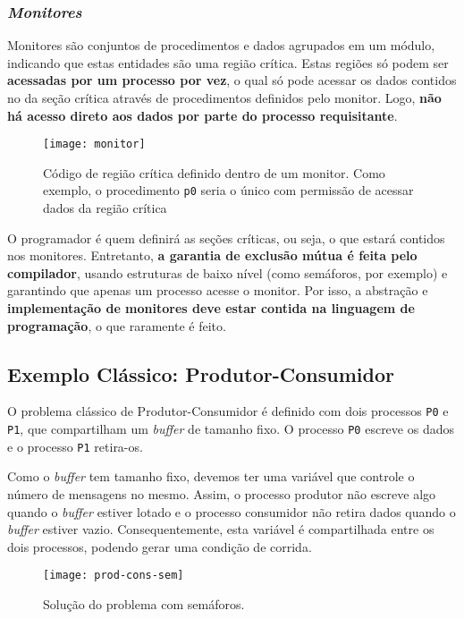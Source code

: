 \subsubsection{\textit{Monitores}}
Monitores são conjuntos de procedimentos e dados agrupados em um módulo, indicando que estas entidades são uma região crítica. Estas regiões só podem ser \textbf{acessadas por um processo por vez}, o qual só pode acessar os dados contidos no da seção crítica através de procedimentos definidos pelo monitor. Logo, \textbf{não há acesso direto aos dados por parte do processo requisitante}.

\begin{figure}[ht]
  \centering
  \texttt{[image: monitor]}
  \caption{Código de região crítica definido dentro de um monitor. Como exemplo, o procedimento \texttt{p0} seria o único com permissão de acessar dados da região crítica}
  \label{fig:monitor}
\end{figure}

O programador é quem definirá as seções críticas, ou seja, o que estará contidos nos monitores. Entretanto, \textbf{a garantia de exclusão mútua é feita pelo compilador}, usando estruturas de baixo nível (como semáforos, por exemplo) e garantindo que apenas um processo acesse o monitor. Por isso, a abstração e \textbf{implementação de monitores deve estar contida na linguagem de programação}, o que raramente é feito.








\subsection{Exemplo Clássico: Produtor-Consumidor}
O problema clássico de Produtor-Consumidor é definido com dois processos \texttt{P0} e \texttt{P1}, que compartilham um \textit{buffer} de tamanho fixo. O processo \texttt{P0} escreve os dados e o processo \texttt{P1} retira-os.

Como o \textit{buffer} tem tamanho fixo, devemos ter uma variável que controle o número de mensagens no mesmo. Assim, o processo produtor não escreve algo quando o \textit{buffer} estiver lotado e o processo consumidor não retira dados quando o \textit{buffer} estiver vazio. Consequentemente, esta variável é compartilhada entre os dois processos, podendo gerar uma condição de corrida.

\begin{figure}[H]
  \centering
  \texttt{[image: prod-cons-sem]}
  \caption{Solução do problema com semáforos.}
  \label{fig:prod-cons-sem}
\end{figure}

